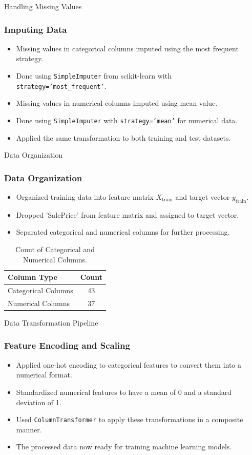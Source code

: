 \begin{frame}{Handling Missing Values}
    \frametitle{Imputing Data}
    \begin{itemize}
        \item Missing values in categorical columns imputed using the most frequent strategy.
        \item Done using \texttt{SimpleImputer} from scikit-learn with \texttt{strategy='most\_frequent'}.
        \item Missing values in numerical columns imputed using mean value.
        \item Done using \texttt{SimpleImputer} with \texttt{strategy='mean'} for numerical data.
        \item Applied the same transformation to both training and test datasets.
    \end{itemize}
\end{frame}

\begin{frame}{Data Organization}
    \frametitle{Data Organization}
    \begin{itemize}
        \item Organized training data into feature matrix \(X_{\text{train}}\) and target vector \(y_{\text{train}}\).
        \item Dropped 'SalePrice' from feature matrix and assigned to target vector.
        \item Separated categorical and numerical columns for further processing.
    \end{itemize}
    \begin{table}[H]
        \centering
        \small
        \begin{tabular}{|l|c|}
        \hline
        \textbf{Column Type} & \textbf{Count} \\
        \hline
        Categorical Columns & 43 \\
        Numerical Columns & 37 \\
        \hline
        \end{tabular}
        \caption{Count of Categorical and Numerical Columns.}
        \label{tab:column_counts}
    \end{table}
\end{frame}

\begin{frame}{Data Transformation Pipeline}
    \frametitle{Feature Encoding and Scaling}
    \begin{itemize}
        \item Applied one-hot encoding to categorical features to convert them into a numerical format.
        \item Standardized numerical features to have a mean of 0 and a standard deviation of 1.
        \item Used \texttt{ColumnTransformer} to apply these transformations in a composite manner.
        \item The processed data now ready for training machine learning models.
    \end{itemize}
\end{frame}

